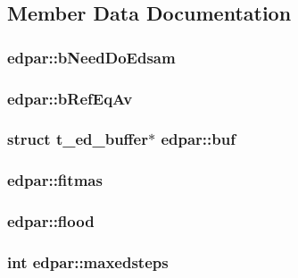 \subsection{\-Member \-Data \-Documentation}
\hypertarget{structedpar_a52e32c80804e39f36cf59ed974f2031d}{
\subsubsection[{b\-Need\-Do\-Edsam}]{ {\bf edpar\-::b\-Need\-Do\-Edsam}}}\label{structedpar_a52e32c80804e39f36cf59ed974f2031d}
\hypertarget{structedpar_a7ce771f9c278bd85aeb3739171f59dda}{
\subsubsection[{b\-Ref\-Eq\-Av}]{ {\bf edpar\-::b\-Ref\-Eq\-Av}}}\label{structedpar_a7ce771f9c278bd85aeb3739171f59dda}
\hypertarget{structedpar_a884a1cb25ba96e88062a16344933d31a}{
\subsubsection[{buf}]{\setlength{\rightskip}{0pt plus 5cm}struct {\bf t\-\_\-ed\-\_\-buffer}$\ast$ {\bf edpar\-::buf}}}\label{structedpar_a884a1cb25ba96e88062a16344933d31a}
\hypertarget{structedpar_a8cc343f0bb713e555313cd0a236dad7a}{
\subsubsection[{fitmas}]{ {\bf edpar\-::fitmas}}}\label{structedpar_a8cc343f0bb713e555313cd0a236dad7a}
\hypertarget{structedpar_a6e206b87c9526d40497901bf6b767bdd}{
\subsubsection[{flood}]{ {\bf edpar\-::flood}}}\label{structedpar_a6e206b87c9526d40497901bf6b767bdd}
\hypertarget{structedpar_a35235bf4f2b5347417f3ee3a1b89a97f}{
\subsubsection[{maxedsteps}]{\setlength{\rightskip}{0pt plus 5cm}int {\bf edpar\-::maxedsteps}}}\label{structedpar_a35235bf4f2b5347417f3ee3a1b89a97f}
